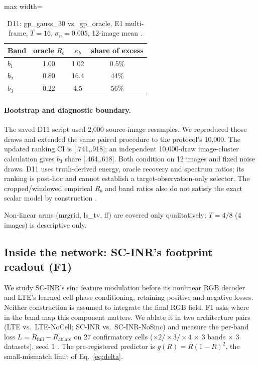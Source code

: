 \begin{table}[t]\centering\small
\caption{D11: gp\_gauss\_30 vs.\ gp\_oracle, E1 multi-frame, $T=16$,
$\sigma_n=0.005$, 12-image mean .}\label{tab:d11}
\begin{adjustbox}{max width=\linewidth}\begin{tabular}{lccc}\toprule
Band & oracle $R_b$ & $\kappa_b$ & share of excess\\\midrule
$b_1$ & 1.00 & 1.02 & 0.5\%\\
$b_2$ & 0.80 & 16.4 & 44\%\\
$b_3$ & 0.22 & 4.5 & 56\%\\
\bottomrule\end{tabular}\end{adjustbox}
\end{table}

\paragraph{Bootstrap and diagnostic boundary.} The saved D11 script used
2,000 source-image resamples. We reproduced those draws and extended the
same paired procedure to the protocol's 10,000. The updated ranking CI is
[.741,.918]; an independent 10,000-draw image-cluster calculation gives
$b_3$ share [.464,.618]. Both condition on 12 images and fixed noise draws.
D11 uses truth-derived energy, oracle recovery and spectrum ratios;
its ranking is post-hoc and cannot establish a target-observation-only
selector. The cropped/windowed empirical $R_b$ and band ratios also do not
satisfy the exact scalar model by construction .

\noindent Non-linear arms (mrgrid, ls\_tv, ff) are covered only
qualitatively; $T=4/8$ (4 images) is descriptive only.


\subsection{Inside the network: SC-INR's footprint readout (F1)}\label{sec:exp-f1}

We study SC-INR's sinc feature modulation before its nonlinear RGB decoder and LTE's learned cell-phase conditioning, retaining positive and negative losses. Neither construction is assumed to integrate the final RGB field. F1 asks where in the band map this
component matters. We ablate it in two architecture pairs (LTE vs.\
LTE-NoCell; SC-INR vs.\ SC-INR-NoSinc) and measure the per-band loss
$L=R_{\mathrm{full}}-R_{\mathrm{ablate}}$ on 27 confirmatory cells
($\times2/\times3/\times4$ $\times$ 3 bands $\times$ 3 datasets), seed 1
\src{F1}. The pre-registered predictor is $g(R)=R(1-R)^2$, the
small-mismatch limit of Eq.~\eqref{eq:delta}.

